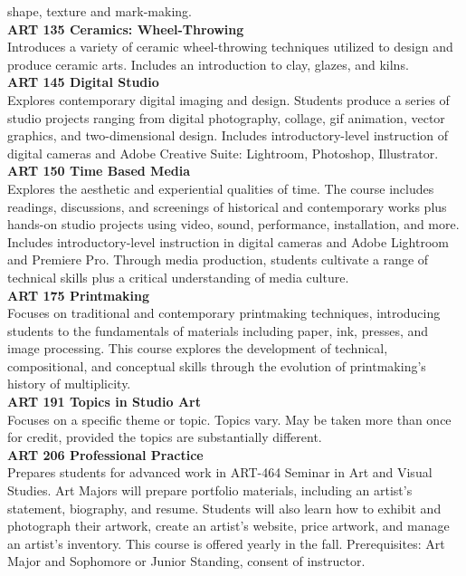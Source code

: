 \documentclass[
  letterpaper,
]{scrbook}
\begin{document}
shape, texture and mark-making.\\
\textbf{ART 135 Ceramics: Wheel-Throwing}\\
Introduces a variety of ceramic wheel-throwing techniques utilized to
design and produce ceramic arts. Includes an introduction to clay,
glazes, and kilns.\\
\textbf{ART 145 Digital Studio}\\
Explores contemporary digital imaging and design. Students produce a
series of studio projects ranging from digital photography, collage, gif
animation, vector graphics, and two-dimensional design. Includes
introductory-level instruction of digital cameras and Adobe Creative
Suite: Lightroom, Photoshop, Illustrator.\\
\textbf{ART 150 Time Based Media}\\
Explores the aesthetic and experiential qualities of time. The course
includes readings, discussions, and screenings of historical and
contemporary works plus hands-on studio projects using video, sound,
performance, installation, and more. Includes introductory-level
instruction in digital cameras and Adobe Lightroom and Premiere Pro.
Through media production, students cultivate a range of technical skills
plus a critical understanding of media culture.\\
\textbf{ART 175 Printmaking}\\
Focuses on traditional and contemporary printmaking techniques,
introducing students to the fundamentals of materials including paper,
ink, presses, and image processing. This course explores the development
of technical, compositional, and conceptual skills through the evolution
of printmaking's history of multiplicity.\\
\textbf{ART 191 Topics in Studio Art}\\
Focuses on a specific theme or topic. Topics vary. May be taken more
than once for credit, provided the topics are substantially different.\\
\textbf{ART 206 Professional Practice}\\
Prepares students for advanced work in ART-464 Seminar in Art and Visual
Studies. Art Majors will prepare portfolio materials, including an
artist's statement, biography, and resume. Students will also learn how
to exhibit and photograph their artwork, create an artist's website,
price artwork, and manage an artist's inventory. This course is offered
yearly in the fall. Prerequisites: Art Major and Sophomore or Junior
Standing, consent of instructor.
\end{document}
